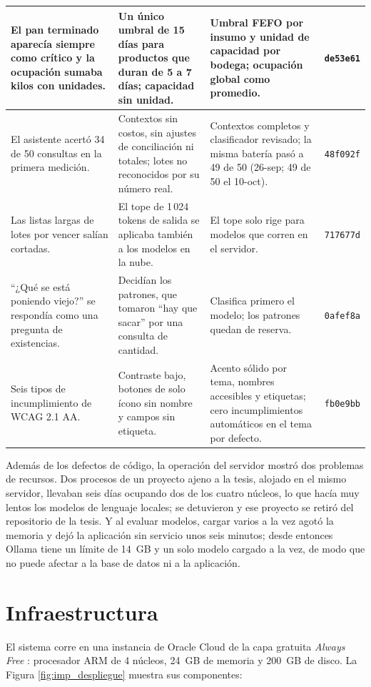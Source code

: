 {\begin{longtable}{|p{3.6cm}|p{5.6cm}|p{4.2cm}|p{1.4cm}|}
El pan terminado aparecía siempre como crítico y la ocupación sumaba kilos con unidades. & Un único umbral de 15 días para productos que duran de 5 a 7 días; capacidad sin unidad. & Umbral FEFO por insumo y unidad de capacidad por bodega; ocupación global como promedio. & \texttt{de53e61} \\ \hline
El asistente acertó 34 de 50 consultas en la primera medición. & Contextos sin costos, sin ajustes de conciliación ni totales; lotes no reconocidos por su número real. & Contextos completos y clasificador revisado; la misma batería pasó a 49 de 50 (26-sep; 49 de 50 el 10-oct). & \texttt{48f092f} \\ \hline
Las listas largas de lotes por vencer salían cortadas. & El tope de 1\,024 tokens de salida se aplicaba también a los modelos en la nube. & El tope solo rige para modelos que corren en el servidor. & \texttt{717677d} \\ \hline
``¿Qué se está poniendo viejo?'' se respondía como una pregunta de existencias. & Decidían los patrones, que tomaron ``hay que sacar'' por una consulta de cantidad. & Clasifica primero el modelo; los patrones quedan de reserva. & \texttt{0afef8a} \\ \hline
Seis tipos de incumplimiento de WCAG 2.1 AA. & Contraste bajo, botones de solo ícono sin nombre y campos sin etiqueta. & Acento sólido por tema, nombres accesibles y etiquetas; cero incumplimientos automáticos en el tema por defecto. & \texttt{fb0e9bb} \\ \hline
\end{longtable}
}

Además de los defectos de código, la operación del servidor mostró dos problemas de recursos. Dos procesos de un proyecto ajeno a la tesis, alojado en el mismo servidor, llevaban seis días ocupando dos de los cuatro núcleos, lo que hacía muy lentos los modelos de lenguaje locales; se detuvieron y ese proyecto se retiró del repositorio de la tesis. Y al evaluar modelos, cargar varios a la vez agotó la memoria y dejó la aplicación sin servicio unos seis minutos; desde entonces Ollama tiene un límite de 14~GB y un solo modelo cargado a la vez, de modo que no puede afectar a la base de datos ni a la aplicación.

\section{Infraestructura}
\label{sec:imp_infraestructura}

El sistema corre en una instancia de Oracle Cloud de la capa gratuita \textit{Always Free} \cite{oci_always_free}: procesador ARM de 4 núcleos, 24~GB de memoria y 200~GB de disco. La Figura \ref{fig:imp_despliegue} muestra sus componentes:

